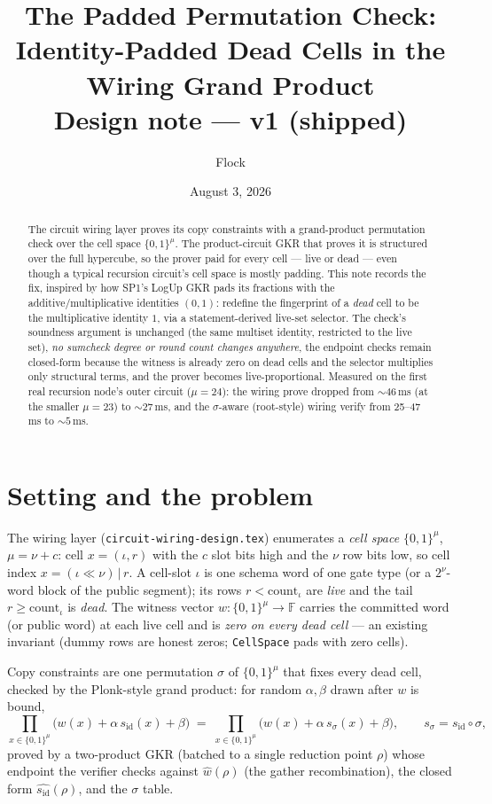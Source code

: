 \documentclass[11pt]{article}
\title{The Padded Permutation Check:\\
Identity-Padded Dead Cells in the Wiring Grand Product\\[0.6ex]
\large Design note --- v1 (shipped)}
\author{Flock}
\date{August 3, 2026}
\newcommand{\F}{\mathbb{F}}
\newcommand{\code}[1]{\texttt{#1}}
\newcommand{\sid}{s_{\mathrm{id}}}
\newcommand{\ssig}{s_{\sigma}}
\newcommand{\Bmu}{\{0,1\}^{\mu}}
\theoremstyle{definition}
\begin{document}
\maketitle

\begin{abstract}
The circuit wiring layer proves its copy constraints with a grand-product
permutation check over the cell space $\Bmu$. The product-circuit GKR that
proves it is structured over the full hypercube, so the prover paid for
every cell --- live or dead --- even though a typical recursion circuit's
cell space is mostly padding. This note records the fix, inspired by how
SP1's LogUp GKR pads its fractions with the additive/multiplicative
identities $(0,1)$: redefine the fingerprint of a \emph{dead} cell to be
the multiplicative identity $1$, via a statement-derived live-set
selector. The check's soundness argument is unchanged (the same multiset
identity, restricted to the live set), \emph{no sumcheck degree or round
count changes anywhere}, the endpoint checks remain closed-form because
the witness is already zero on dead cells and the selector multiplies
only structural terms, and the prover becomes live-proportional. Measured
on the first real recursion node's outer circuit ($\mu = 24$): the wiring
prove dropped from ${\sim}46$\,ms (at the smaller $\mu = 23$) to
${\sim}27$\,ms, and the $\sigma$-aware (root-style) wiring verify from
25--47\,ms to ${\sim}5$\,ms.
\end{abstract}

\section{Setting and the problem}

The wiring layer (\code{circuit-wiring-design.tex}) enumerates a
\emph{cell space} $\Bmu$, $\mu = \nu + c$: cell $x = (\iota, r)$ with the
$c$ slot bits high and the $\nu$ row bits low, so cell index
$x = (\iota \ll \nu) \,|\, r$. A cell-slot $\iota$ is one schema word of
one gate type (or a $2^{\nu}$-word block of the public segment); its rows
$r < \mathrm{count}_\iota$ are \emph{live} and the tail
$r \ge \mathrm{count}_\iota$ is \emph{dead}. The witness vector
$w : \Bmu \to \F$ carries the committed word (or public word) at each
live cell and is \emph{zero on every dead cell} --- an existing invariant
(dummy rows are honest zeros; \code{CellSpace} pads with zero cells).

Copy constraints are one permutation $\sigma$ of $\Bmu$ that fixes every
dead cell, checked by the Plonk-style grand product: for random
$\alpha, \beta$ drawn after $w$ is bound,
\begin{equation}
\label{eq:plain}
\prod_{x \in \Bmu}\bigl(w(x) + \alpha\,\sid(x) + \beta\bigr)
\;=\;
\prod_{x \in \Bmu}\bigl(w(x) + \alpha\,\ssig(x) + \beta\bigr),
\qquad \ssig = \sid \circ \sigma,
\end{equation}
proved by a two-product GKR (batched to a single reduction point $\rho$)
whose endpoint the verifier checks against $\widehat{w}(\rho)$ (the
gather recombination), the closed form $\widehat{\sid}(\rho)$, and the
$\sigma$ table.
\end{document}
